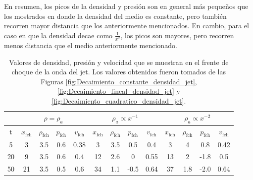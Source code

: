 \documentclass[12pt,a4paper]{book}
\begin{document}
En resumen, los picos de la densidad y presión 
son en general más pequeños que los mostrados en donde la densidad del medio es constante, pero también recorren mayor 
distancia que los anteriormente mencionados. En cambio, para el caso en que la densidad decae como $\frac{1}{x^2}$, los picos son mayores, pero recorren menos distancia que el medio anteriormente mencionado.


\begin{table}[htbp]
  \begin{center}
  \begin{tabular}{|c|c|c|c|c|c|c|c|c|c|c|c|c|}
    \hline 
    & \multicolumn{4}{|c|}{$\rho = \rho_a$} & \multicolumn{4}{|c|}{$\rho_a \propto x^{-1}$} & \multicolumn{4}{|c|}{$\rho_a \propto x^{-2}$}\\
    \hline
    t & $x_{\text{fch}}$ & $\rho_{\text{fch}}$ & $p_{\text{fch}}$ & $v_{\text{fch}}$ & $x_{\text{fch}}$ & 
    $\rho_{\text{fch}}$ & $p_{\text{fch}}$ & $v_{\text{fch}}$ & $x_{\text{fch}}$ & $\rho_{\text{fch}}$ & $p_{\text{fch}}$ & 
    $v_{\text{fch}}$ \\
    \hline
     5 & 3  & 3.5 & 0.6 & 0.38    &  3  & 3.5 &  0.5  & 0.4     & 3  & 4   & 0.8  & 0.42 \\
    \hline
    20 & 9  & 3.5 & 0.6 & 0.4    &  12 & 2.6 &   0   & 0.55    & 13 & 2   & -1.8 & 0.5 \\
    \hline
    50 & 21 & 3.5 & 0.5 & 0.6    &  34 & 1.1 & -0.5  & 0.64     & 37 & 1.8 & -2.0 & 0.64 \\
    \hline

  \end{tabular}
  \caption{\label{Cuadro:valores_frente_choque} Valores de densidad, presión y velocidad que se muestran en el frente
  de choque de la onda del jet. Los valores obtenidos fueron tomados de las Figuras \ref{fig:Decaimiento_constante_densidad_jet},
  \ref{fig:Decaimiento_lineal_densidad_jet} y \ref{fig:Decaimiento_cuadratico_densidad_jet}.}
  \end{center}
  \end{table}
\end{document}
